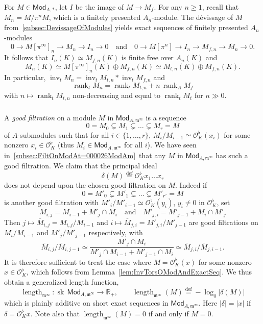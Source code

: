 \documentclass[11pt]{article}
\theoremstyle{definition}
\numberwithin{equation}{section}
\numberwithin{figure}{section}
\numberwithin{table}{section}
\newcommand{\Mod}{\mathsf{Mod}}
\DeclareMathOperator{\inv}{inv}
\DeclareMathOperator{\length}{length}
\DeclareMathOperator{\rank}{rank}
\DeclareMathOperator{\sk}{sk}
\newcommand{\eqd}{\stackrel{\mathrm{def}}{=}}
\begin{document}
For $M\in\Mod_{A,\ast}$, let $I$ be the image of $M\rightarrow M_{f}$. For any $n\geq1$, recall that $M_{n}=M/\pi^{n}M$, which is a finitely presented $A_{n}$-module. The d\'evissage of $M$ from~\ref{subsec:DevissageOfModules} yields exact sequences of finitely presented $A_{n}$-modules
\[
0\rightarrow M[\pi^{\infty}]_{n}\rightarrow M_{n}\rightarrow I_{n}\rightarrow0\quad\text{and}\quad0\rightarrow\overline{M}[\pi^{n}]\rightarrow I_{n}\rightarrow M_{f,n}\rightarrow\overline{M}_{n}\rightarrow0.
\]
It follows that $I_{n}(K)\simeq M_{f,n}(K)$ is finite free over $A_{n}(K)$ and
\[
M_{n}(K)\simeq M[\pi^{\infty}]_{n}(K)\oplus M_{f,n}(K)\simeq M_{t,n}(K)\oplus M_{f,n}(K).
\]
In particular, $\inv_{t}M_{n}=\inv_{t}M_{t,n}\ast\inv_{t}M_{f,n}$ and
\[
\rank_{t}M_{n}=\rank_{t}M_{t,n}+n\,\rank_{A}M_{f}
\]
with $n\mapsto\rank_{t}M_{t,n}$ non-decreasing and equal to $\rank_{t}M_{t}$ for $n\gg0$.

\subsubsection{}\label{subsec:defdegonModminfty}

A \emph{good filtration} on a module $M$ in $\Mod_{A,\mathfrak{m}^{\infty}}$ is a sequence
\[
0=M_{0}\subsetneq M_{1}\subsetneq\dots\subsetneq M_{r}=M
\]
of $A$-submodules such that for all $i\in\{1,\dots,r\}$, $M_{i}/M_{i-1}\simeq\mathcal{O}_{K}^{\flat}(x_{i})$ for some nonzero $x_{i}\in\mathcal{O}_{K}^{\flat}$ (thus $M_{i}\in\Mod_{A,\mathfrak{m}^{\infty}}$ for all $i$). We have seen in~\ref{subsec:FiltOnModAt=000026ModAm}~that any $M$ in $\Mod_{A,\mathfrak{m}^{\infty}}$ has such a good filtration. We claim that the principal ideal
\[
\delta(M)\eqd\mathcal{O}_{K}^{\flat}x_{1}\dots x_{r}
\]
does not depend upon the chosen good filtration on $M$. Indeed if
\[
0=M'_{0}\subsetneq M'_{1}\subsetneq\dots\subsetneq M'_{r'}=M
\]
is another good filtration with $M'_{i}/M'_{i-1}\simeq\mathcal{O}_{K}^{\flat}(y_{i})$, $y_{i}\neq0$ in $\mathcal{O}_{K}^{\flat}$, set
\[
M_{i,j}=M_{i-1}+M'_{j}\cap M_{i}\quad\text{and}\quad M'_{j,i}=M'_{j-1}+M_{i}\cap M'_{j}
\]
Then $j\mapsto\overline{M}_{i,j}=M_{i,j}/M_{i-1}$ and $i\mapsto\overline{M}_{j,i}=M'_{j,i}/M'_{j-1}$ are good filtrations on $M_{i}/M_{i-1}$ and $M'_{j}/M'_{j-1}$ respectively, with
\[
\overline{M}_{i,j}/\overline{M}_{i,j-1}\simeq\frac{M'_{j}\cap M_{i}}{M'_{j}\cap M_{i-1}+M'_{j-1}\cap M_{i}}\simeq\overline{M}_{j,i}/\overline{M}_{j,i-1}.
\]
It is therefore sufficient to treat the case where $M=\mathcal{O}_{K}^{\flat}(x)$ for some nonzero $x\in\mathcal{O}_{K}^{\flat}$, which follows from Lemma~\ref{lem:InvTorsOModAndExactSeq}. We thus obtain a generalized length function,
\[
\length_{\mathfrak{m}^{\infty}}:\sk\,\Mod_{A,\mathfrak{m}^{\infty}}\rightarrow\mathbb{R}_{+},\qquad\length_{\mathfrak{m}^{\infty}}(M)\eqd-\log_{q}\left|\delta(M)\right|
\]
which is plainly additive on short exact sequences in $\Mod_{A,\mathfrak{m}^{\infty}}$. Here $\left|\delta\right|=\left|x\right|$ if $\delta=\mathcal{O}_{K}^{\flat}x$. Note also that $\length_{\mathfrak{m}^{\infty}}(M)=0$ if and only if $M=0$.
\end{document}
